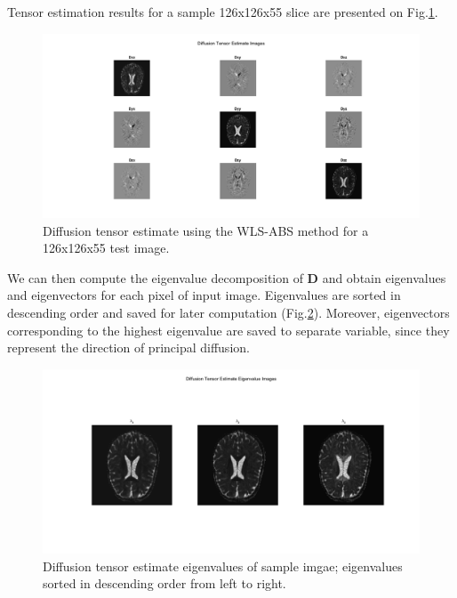 Tensor estimation results for a sample 126x126x55 slice are presented on Fig.\ref{fig:m6_pic_2}.

\begin{figure}[H]
	\includegraphics[width=16cm]{figures/Module_06/tensor_image}
	\centering
	\caption{Diffusion tensor estimate using the WLS-ABS method for a 126x126x55 test image.}
	\label{fig:m6_pic_2}
\end{figure}

We can then compute the eigenvalue decomposition of $\boldsymbol{D}$ and obtain eigenvalues and eigenvectors for each pixel of input image. Eigenvalues are sorted in descending order and saved for later computation (Fig.\ref{fig:m6_pic_3}). Moreover, eigenvectors corresponding to the highest eigenvalue are saved to separate variable, since they represent the direction of principal diffusion.

\begin{figure}[H]
	\includegraphics[width=16cm]{figures/Module_06/eig_image}
	\centering
	\caption{Diffusion tensor estimate eigenvalues of sample imgae; eigenvalues sorted in descending order from left to right.}
	\label{fig:m6_pic_3}
\end{figure}

